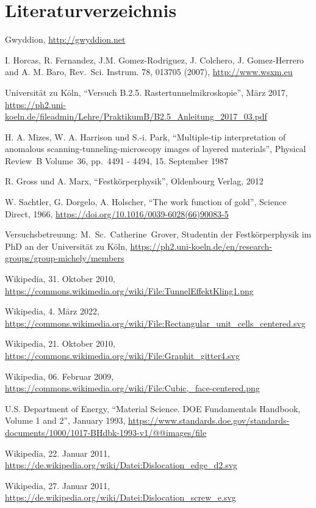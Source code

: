 \documentclass[12pt,a4paper]{scrartcl}
\numberwithin{equation}{section} %
\begin{document}
\clearpage
\hypertarget{literatur}{%
\section{Literaturverzeichnis}\label{literatur}}
\renewcommand{\section}[2]{} %
\begin{thebibliography}{9}
	Gwyddion, \url{http://gwyddion.net}

	I. Horcas, R. Fernandez, J.M. Gomez-Rodriguez, J. Colchero, J. Gomez-Herrero and A. M. Baro, Rev.~Sci. Instrum. 78, 013705 (2007), \url{http://www.wsxm.eu}

	Universität zu Köln, ``Versuch B.2.5. Rastertunnelmikroskopie'', März 2017, 	\url{https://ph2.uni-koeln.de/fileadmin/Lehre/PraktikumB/B2.5_Anleitung_2017_03.pdf}

	H. A. Mizes, W. A. Harrison und S.-i. Park, ``Multiple-tip interpretation of anomalous scanning-tunneling-microscopy images of layered materials'', Physical Review~B Volume~36, pp.~4491 - 4494, 15. September 1987

	R. Gross und A. Marx, ``Festkörperphysik'', Oldenbourg Verlag, 2012

	W. Sachtler, G. Dorgelo, A. Holscher, ``The work function of gold'', Science Direct, 1966,
	\url{https://doi.org/10.1016/0039-6028(66)90083-5}

	Versuchsbetreuung: M.~Sc.~Catherine~Grover, Studentin der Festkörperphysik im PhD an der Universität zu Köln, \url{https://ph2.uni-koeln.de/en/research-groups/group-michely/members}

	Wikipedia, 31. Oktober 2010, \url{https://commons.wikimedia.org/wiki/File:TunnelEffektKling1.png}

	Wikipedia, 4. März 2022, \url{https://commons.wikimedia.org/wiki/File:Rectangular_unit_cells_centered.svg}

	Wikipedia, 21. Oktober 2010, \url{https://commons.wikimedia.org/wiki/File:Graphit_gitter4.svg}

	Wikipedia, 06. Februar 2009, \url{https://commons.wikimedia.org/wiki/File:Cubic,_face-centered.png}

	U.S. Department of Energy, ``Material Science. DOE Fundamentals Handbook, Volume 1 and 2'', January 1993, \url{https://www.standards.doe.gov/standards-documents/1000/1017-BHdbk-1993-v1/@@images/file}

	Wikipedia, 22. Januar 2011, \url{https://de.wikipedia.org/wiki/Datei:Dislocation_edge_d2.svg}

	Wikipedia, 27. Januar 2011, \url{https://de.wikipedia.org/wiki/Datei:Dislocation_screw_e.svg}

\end{thebibliography}
\end{document}
